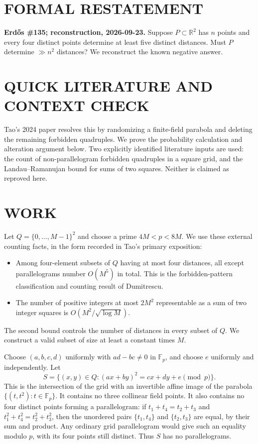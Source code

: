 \section{FORMAL RESTATEMENT}
\textbf{Erd\H{o}s \#135; reconstruction, 2026-09-23.}
Suppose $P\subset\mathbb R^2$ has $n$ points and every four distinct
points determine at least five distinct distances. Must $P$ determine
$\gg n^2$ distances? We reconstruct the known negative answer.

\section{QUICK LITERATURE AND CONTEXT CHECK}
Tao's 2024 paper resolves this by randomizing a finite-field parabola
and deleting the remaining forbidden quadruples. We prove the
probability calculation and alteration argument below. Two explicitly
identified literature inputs are used: the count of non-parallelogram
forbidden quadruples in a square grid, and the Landau--Ramanujan bound
for sums of two squares. Neither is claimed as reproved here.

\section{WORK}
Let $Q=\{0,\ldots,M-1\}^2$ and choose a prime $4M<p<8M$.
We use these external counting facts, in the form recorded in Tao's
primary exposition:
\begin{itemize}
\item Among four-element subsets of $Q$ having at most four distances,
all except parallelograms number $O(M^5)$ in total. This is the
forbidden-pattern classification and counting result of Dumitrescu.
\item The number of positive integers at most $2M^2$ representable as
a sum of two integer squares is $O(M^2/\sqrt{\log M})$.
\end{itemize}
The second bound controls the number of distances in every subset of
$Q$. We construct a valid subset of size at least a constant times $M$.

Choose $(a,b,c,d)$ uniformly with $ad-bc\ne0$ in $\mathbb F_p$, and
choose $e$ uniformly and independently. Let
\[
 S=\{(x,y)\in Q:(ax+by)^2=cx+dy+e\pmod p\}.
\]
This is the intersection of the grid with an invertible affine image
of the parabola $\{(t,t^2):t\in\mathbb F_p\}$. It contains no three
collinear field points. It also contains no four distinct points forming
a parallelogram: if $t_1+t_4=t_2+t_3$ and
$t_1^2+t_4^2=t_2^2+t_3^2$, then the unordered pairs
$\{t_1,t_4\}$ and $\{t_2,t_3\}$ are equal, by their sum and product.
Any ordinary grid parallelogram would give such an equality modulo
$p$, with its four points still distinct. Thus $S$ has no parallelograms.

